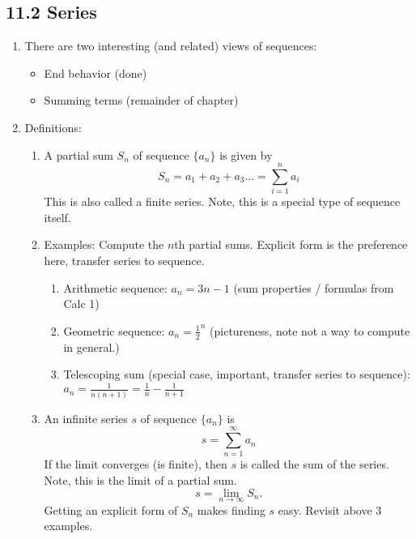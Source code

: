 \documentclass{article}
\begin{document}
\subsection{11.2 Series}
\begin{enumerate}

\item There are two interesting (and related) views of sequences:
\begin{itemize}
\item End behavior (done)
\item Summing terms (remainder of chapter)
\end{itemize}

\item Definitions:
\begin{enumerate}

\item A partial sum $S_n$ of sequence $\{a_n\}$ is given by
$$
S_n = a_1+a_2+a_3... = \sum_{i=1}^n a_i
$$
This is also called a finite series. Note, this is a special type of sequence itself.

\item Examples: Compute the $n$th partial sums. Explicit form is the preference here, transfer series to sequence.
\begin{enumerate}
\item Arithmetic sequence: $a_n = 3n-1$ (sum properties / formulas from Calc 1)
\item Geometric sequence: $a_n = \frac{1}{2}^n$ (pictureness, note not a way to compute in general.)
\item Telescoping sum (special case, important, transfer series to sequence): $a_n=\frac{1}{n(n+1)}=\frac{1}{n} - \frac{1}{n+1}$
\end{enumerate}

\item An infinite series $s$ of sequence $\{a_n\}$ is
$$
s = \sum_{n=1}^\infty a_n
$$
If the limit converges (is finite), then $s$ is called the sum of the series. Note, this is the limit of a partial sum.
$$
s = \lim_{n\rightarrow\infty }S_n.
$$
Getting an explicit form of $S_n$ makes finding $s$ easy. Revisit above 3 examples.
\end{enumerate}


\end{enumerate}
\end{document}
